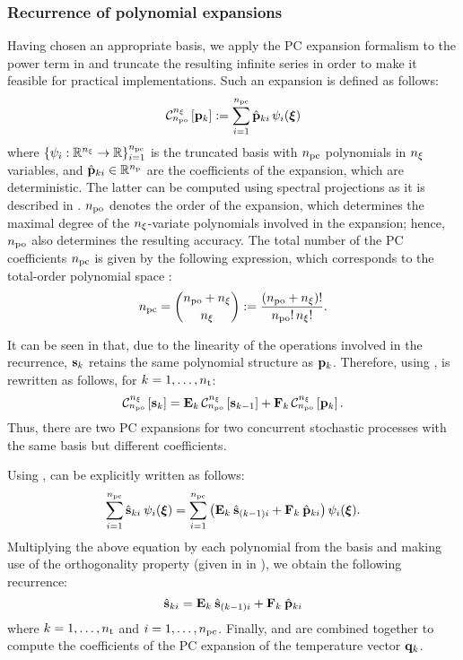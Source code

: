 \subsubsection{Recurrence of polynomial expansions} 
Having chosen an appropriate basis, we apply the PC expansion formalism to the power term in  and truncate the resulting infinite series in order to make it feasible for practical implementations.
Such an expansion is defined as follows:
\begin{equation} \elabel{pc-expansion}
  \oPC{\nvars}{\pcorder}{\vP_k} := \sum_{i = 1}^{\pcterms} \pcc{\vP}_{ki} \, \pcb_i(\vZ)
\end{equation}
where $\{ \psi_i: \mathbb{R}^{n_\xi} \to \mathbb{R} \}_{i = 1}^{{n_\text{pc}}}$ is the truncated basis with ${n_\text{pc}}$ polynomials in ${n_\xi}$ variables, and $\hat{\mathbf{p}}_{ki} \in \mathbb{R}^{n_\text{p}}$ are the coefficients of the expansion, which are deterministic.
The latter can be computed using spectral projections as it is described in .
${n_\text{po}}$ denotes the order of the expansion, which determines the maximal degree of the ${n_\xi}$-variate polynomials involved in the expansion; hence, ${n_\text{po}}$ also determines the resulting accuracy.
The total number of the PC coefficients ${n_\text{pc}}$ is given by the following expression, which corresponds to the total-order polynomial space \cite{eldred2008, beck2011}:
\begin{equation} \elabel{pc-terms}
  \pcterms = { \pcorder + \nvars \choose \nvars } := \frac{(\pcorder + \nvars)!}{\pcorder! \, \nvars!}.
\end{equation}

It can be seen in  that, due to the linearity of the operations involved in the recurrence, $\mathbf{s}_k$ retains the same polynomial structure as $\mathbf{p}_k$.
Therefore, using ,  is rewritten as follows, for $k = 1, \dotsc, {n_\text{t}}$:
\begin{equation} \elabel{expanded-recurrence}
  \oPC{\nvars}{\pcorder}{\vS_k} = \mCF_k \, \oPC{\nvars}{\pcorder}{\vS_{k-1}} + \mCS_k \, \oPC{\nvars}{\pcorder}{\vP_k}.
\end{equation}
Thus, there are two PC expansions for two concurrent stochastic processes with the same basis but different coefficients.

Using ,  can be explicitly written as follows:
\[
  \sum_{i = 1}^{\pcterms} \pcc{\vS}_{ki} \: \pcb_i(\vZ) = \sum_{i = 1}^{\pcterms} \left( \mCF_k \: \pcc{\vS}_{(k - 1)i} + \mCS_k \: \pcc{\vP}_{ki} \right) \pcb_i(\vZ).
\]
Multiplying the above equation by each polynomial from the basis and making use of the orthogonality property (given in  in ), we obtain the following recurrence:
\begin{equation} \elabel{pc-recurrence}
  \pcc{\vS}_{ki} = \mCF_k \: \pcc{\vS}_{(k - 1)i} + \mCS_k \: \pcc{\vP}_{ki}
\end{equation}
where $k = 1, \dotsc, {n_\text{t}}$ and $i = 1, \dotsc, {n_\text{pc}}$. Finally,  and  are combined together to compute the coefficients of the PC expansion of the temperature vector $\mathbf{q}_k$.

